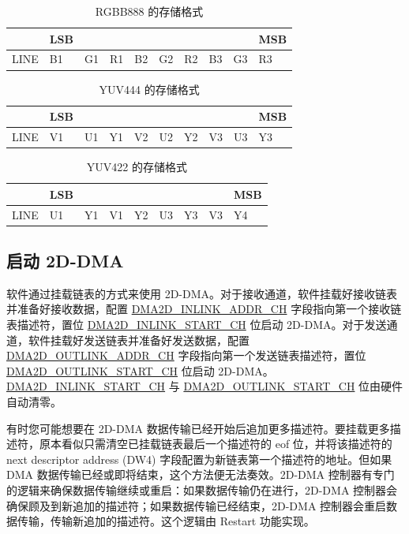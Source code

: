 \documentclass[main\_\_CN.tex]{subfiles}
\begin{document}
\begin{longtable}[c]{|l|l|l|l|l|l|l|l|l|l|}
\caption{RGBB888 的存储格式}
\label{tab:rgb888_order}\\
\hline
          & LSB &    &    &    &    &    &    &    & MSB \\ \hline
    LINE  & B1  & G1 & R1 & B2 & G2 & R2 & B3 & G3 & R3  \\ \hline
\end{longtable}

\begin{longtable}[c]{|l|l|l|l|l|l|l|l|l|l|}
\caption{YUV444 的存储格式}
\label{tab:yuv444_order}\\
\hline
          & LSB &    &    &    &    &    &    &    & MSB \\ \hline
    LINE  & V1  & U1 & Y1 & V2 & U2 & Y2 & V3 & U3 & Y3  \\ \hline
\end{longtable}

\begin{longtable}[c]{|l|l|l|l|l|l|l|l|l|}
\caption{YUV422 的存储格式}
\label{tab:yuv422_order}\\
\hline
          & LSB &    &    &    &    &    &    & MSB \\ \hline
    LINE  & U1  & Y1 & V1 & Y2 & U3 & Y3 & V3 & Y4  \\ \hline
\end{longtable}




\subsection{启动 2D-DMA}

软件通过挂载链表的方式来使用 2D-DMA。对于接收通道，软件挂载好接收链表并准备好接收数据，配置 \hyperref[fielddesc:DMA2DINLINKADDRCHN]{DMA2D\_INLINK\_ADDR\_CH} 字段指向第一个接收链表描述符，置位 \hyperref[fielddesc:DMA2DINLINKSTARTCHN]{DMA2D\_INLINK\_START\_CH} 位启动 2D-DMA。对于发送通道，软件挂载好发送链表并准备好发送数据，配置 \hyperref[fielddesc:DMA2DOUTLINKADDRCHN]{DMA2D\_OUTLINK\_ADDR\_CH} 字段指向第一个发送链表描述符，置位 \hyperref[fielddesc:DMA2DOUTLINKSTARTCHN]{DMA2D\_OUTLINK\_START\_CH} 位启动 2D-DMA。\hyperref[fielddesc:DMA2DINLINKSTARTCHN]{DMA2D\_INLINK\_START\_CH} 与 \hyperref[fielddesc:DMA2DOUTLINKSTARTCHN]{DMA2D\_OUTLINK\_START\_CH} 位由硬件自动清零。

有时您可能想要在 2D-DMA 数据传输已经开始后追加更多描述符。要挂载更多描述符，原本看似只需清空已挂载链表最后一个描述符的 eof 位，并将该描述符的 next descriptor address (DW4) 字段配置为新链表第一个描述符的地址。但如果 DMA 数据传输已经或即将结束，这个方法便无法奏效。2D-DMA 控制器有专门的逻辑来确保数据传输继续或重启：如果数据传输仍在进行，2D-DMA 控制器会确保顾及到新追加的描述符；如果数据传输已经结束，2D-DMA 控制器会重启数据传输，传输新追加的描述符。这个逻辑由 Restart 功能实现。
\end{document}
